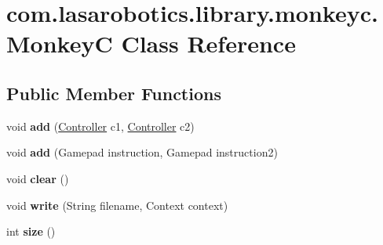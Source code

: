 \hypertarget{classcom_1_1lasarobotics_1_1library_1_1monkeyc_1_1_monkey_c}{}\section{com.\+lasarobotics.\+library.\+monkeyc.\+Monkey\+C Class Reference}
\label{classcom_1_1lasarobotics_1_1library_1_1monkeyc_1_1_monkey_c}
\subsection*{Public Member Functions}
\begin{DoxyCompactItemize}
\item 
\hypertarget{classcom_1_1lasarobotics_1_1library_1_1monkeyc_1_1_monkey_c_a2bc7a1f53adfbfe2cdbb19c456c7b226}{}void {\bfseries add} (\hyperlink{classcom_1_1lasarobotics_1_1library_1_1controller_1_1_controller}{Controller} c1, \hyperlink{classcom_1_1lasarobotics_1_1library_1_1controller_1_1_controller}{Controller} c2)\label{classcom_1_1lasarobotics_1_1library_1_1monkeyc_1_1_monkey_c_a2bc7a1f53adfbfe2cdbb19c456c7b226}

\item 
\hypertarget{classcom_1_1lasarobotics_1_1library_1_1monkeyc_1_1_monkey_c_afceca05780b824278b087f622272e687}{}void {\bfseries add} (Gamepad instruction, Gamepad instruction2)\label{classcom_1_1lasarobotics_1_1library_1_1monkeyc_1_1_monkey_c_afceca05780b824278b087f622272e687}

\item 
\hypertarget{classcom_1_1lasarobotics_1_1library_1_1monkeyc_1_1_monkey_c_a7ac34bb6c6f82809cb68883a127f597e}{}void {\bfseries clear} ()\label{classcom_1_1lasarobotics_1_1library_1_1monkeyc_1_1_monkey_c_a7ac34bb6c6f82809cb68883a127f597e}

\item 
\hypertarget{classcom_1_1lasarobotics_1_1library_1_1monkeyc_1_1_monkey_c_a4c81116b676a38f6f89d486f2828575f}{}void {\bfseries write} (String filename, Context context)\label{classcom_1_1lasarobotics_1_1library_1_1monkeyc_1_1_monkey_c_a4c81116b676a38f6f89d486f2828575f}

\item 
\hypertarget{classcom_1_1lasarobotics_1_1library_1_1monkeyc_1_1_monkey_c_ad5fbc45ad3969c57a36477434b01bb95}{}int {\bfseries size} ()\label{classcom_1_1lasarobotics_1_1library_1_1monkeyc_1_1_monkey_c_ad5fbc45ad3969c57a36477434b01bb95}

\end{DoxyCompactItemize}


